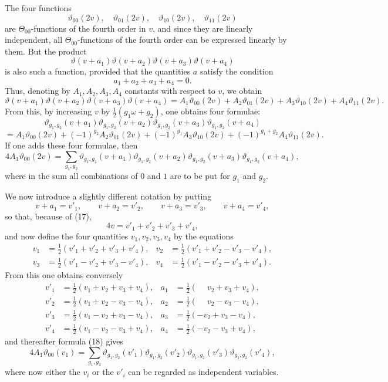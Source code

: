 \documentclass[11pt]{article}
\providecommand{\tht}{\vartheta}
\begin{document}
The four functions
\begin{equation}
\tht_{00}(2v),\quad \tht_{01}(2v),\quad \tht_{10}(2v),\quad \tht_{11}(2v)
\tag{15}
\end{equation}
are $\Theta_{00}$-functions of the fourth order in $v$, and since they are linearly independent, all $\Theta_{00}$-functions of the fourth order can be expressed linearly by them. But the product
\begin{equation}
\tht(v+a_1)\tht(v+a_2)\tht(v+a_3)\tht(v+a_4)
\tag{16}
\end{equation}
is also such a function, provided that the quantities $a$ satisfy the condition
\begin{equation}
a_1+a_2+a_3+a_4=0.
\tag{17}
\end{equation}
Thus, denoting by $A_1,A_2,A_3,A_4$ constants with respect to $v$, we obtain
\[
\tht(v+a_1)\tht(v+a_2)\tht(v+a_3)\tht(v+a_4)
=A_1\tht_{00}(2v)+A_2\tht_{01}(2v)+A_3\tht_{10}(2v)+A_4\tht_{11}(2v).
\]
From this, by increasing $v$ by $\frac12(g_1\omega+g_2)$, one obtains four formulae:
\[
\tht_{g_1,g_2}(v+a_1)\tht_{g_1,g_2}(v+a_2)\tht_{g_1,g_2}(v+a_3)\tht_{g_1,g_2}(v+a_4)
\]
\[
=A_1\tht_{00}(2v)+(-1)^{g_2}A_2\tht_{01}(2v)+(-1)^{g_1}A_3\tht_{10}(2v)+(-1)^{g_1+g_2}A_4\tht_{11}(2v).
\]
If one adds these four formulae, then
\begin{equation}
4A_1\tht_{00}(2v)
=\sum_{g_1,g_2}\tht_{g_1,g_2}(v+a_1)\tht_{g_1,g_2}(v+a_2)
\tht_{g_1,g_2}(v+a_3)\tht_{g_1,g_2}(v+a_4),
\tag{18}
\end{equation}
where in the sum all combinations of $0$ and $1$ are to be put for $g_1$ and $g_2$.

We now introduce a slightly different notation by putting
\[
v+a_1=v'_1,\qquad v+a_2=v'_2,\qquad v+a_3=v'_3,\qquad v+a_4=v'_4,
\]
so that, because of (17),
\[
4v=v'_1+v'_2+v'_3+v'_4,
\]
and now define the four quantities $v_1,v_2,v_3,v_4$ by the equations
\begin{equation}
\begin{aligned}
v_1&=\frac12(v'_1+v'_2+v'_3+v'_4),&
 v_2&=\frac12(v'_1+v'_2-v'_3-v'_4),\\
v_3&=\frac12(v'_1-v'_2+v'_3-v'_4),&
 v_4&=\frac12(v'_1-v'_2-v'_3+v'_4).
\end{aligned}
\tag{19}
\end{equation}
From this one obtains conversely
\begin{equation}
\begin{aligned}
v'_1&=\tfrac12(v_1+v_2+v_3+v_4),& a_1&=\tfrac12(\phantom{-}v_2+v_3+v_4),\\
v'_2&=\tfrac12(v_1+v_2-v_3-v_4),& a_2&=\tfrac12(\phantom{-}v_2-v_3-v_4),\\
v'_3&=\tfrac12(v_1-v_2+v_3-v_4),& a_3&=\tfrac12(-v_2+v_3-v_4),\\
v'_4&=\tfrac12(v_1-v_2-v_3+v_4),& a_4&=\tfrac12(-v_2-v_3+v_4),
\end{aligned}
\tag{20}
\end{equation}
and thereafter formula (18) gives
\[
4A_1\tht_{00}(v_1)=\sum_{g_1,g_2}\tht_{g_1,g_2}(v'_1)\tht_{g_1,g_2}(v'_2)\tht_{g_1,g_2}(v'_3)\tht_{g_1,g_2}(v'_4),
\]
where now either the $v_i$ or the $v'_i$ can be regarded as independent variables.
\end{document}
